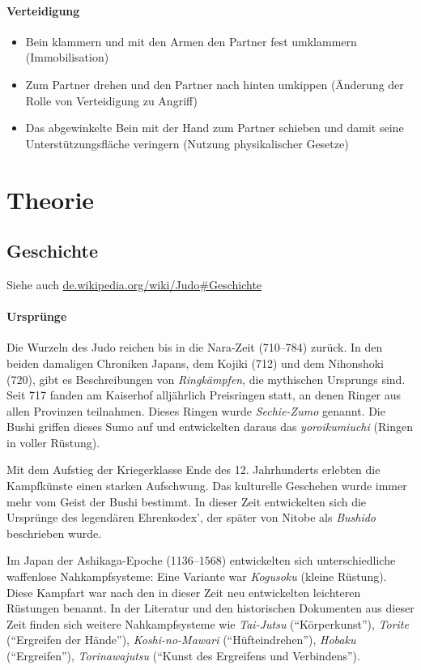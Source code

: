 \documentclass[justified, a4paper, notitlepage, captions=tableheading, nobib]{tufte-handout}
\begin{document}
\paragraph{Verteidigung}
\label{sec:org7ed33d4}
\begin{itemize}
\item Bein klammern und mit den Armen den Partner fest umklammern (Immobilisation)
\item Zum Partner drehen und den Partner nach hinten umkippen (Änderung der Rolle von Verteidigung zu Angriff)
\item Das abgewinkelte Bein mit der Hand zum Partner schieben und damit seine Unterstützungsfläche veringern (Nutzung physikalischer Gesetze)
\end{itemize}

\newpage
\section{Theorie }
\label{sec:orgd4bb23a}
\subsection{Geschichte}
\label{sec:org2634578}
Siehe auch \href{https://de.wikipedia.org/wiki/Judo\#Geschichte}{de.wikipedia.org/wiki/Judo\#Geschichte}

\paragraph{Ursprünge}
\label{sec:org7fe0c53}
Die Wurzeln des \label{org6f56467}Judo reichen bis in die Nara-Zeit (710–784) zurück. In den beiden damaligen Chroniken Japans, dem Kojiki (712) und dem Nihonshoki (720), gibt es Beschreibungen von \emph{Ringkämpfen}, die mythischen Ursprungs sind. Seit 717 fanden am Kaiserhof alljährlich Preisringen statt, an denen Ringer aus allen Provinzen teilnahmen. Dieses Ringen wurde \emph{Sechie-Zumo} genannt. Die Bushi griffen dieses Sumo auf und entwickelten daraus das \emph{yoroikumiuchi} (Ringen in voller Rüstung).

Mit dem Aufstieg der Kriegerklasse Ende des 12. Jahrhunderts erlebten die Kampfkünste einen starken Aufschwung. Das kulturelle Geschehen wurde immer mehr vom Geist der Bushi bestimmt. In dieser Zeit entwickelten sich die Ursprünge des legendären Ehrenkodex', der später von Nitobe als \emph{Bushido} beschrieben wurde.

Im Japan der Ashikaga-Epoche (1136–1568) entwickelten sich unterschiedliche waffenlose Nahkampfsysteme: Eine Variante war \emph{Kogusoku} (kleine Rüstung). Diese Kampfart war nach den in dieser Zeit neu entwickelten leichteren Rüstungen benannt. In der Literatur und den historischen Dokumenten aus dieser Zeit finden sich weitere Nahkampfsysteme wie \emph{Tai-Jutsu} ("`Körperkunst"'), \emph{Torite} ("`Ergreifen der Hände"'), \emph{Koshi-no-Mawari} ("`Hüfteindrehen"'), \emph{Hobaku} ("`Ergreifen"'), \emph{Torinawajutsu} ("`Kunst des Ergreifens und Verbindens"').
\end{document}
